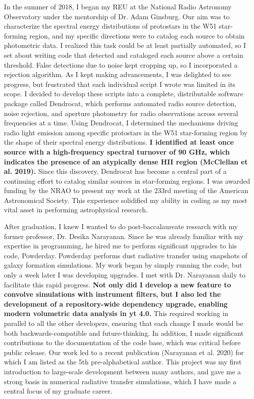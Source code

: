 \documentclass[11pt]{article}
\begin{document}
In the summer of 2018, I began my REU at the National Radio Astronomy Observatory under the mentorship of Dr. Adam Ginsburg. Our aim was to characterize the spectral energy distributions of protostars in the W51 star-forming region, and my specific directions were to catalog each source to obtain photometric data. I realized this task could be at least partially automated, so I set about writing code that detected and cataloged each source above a certain threshold. False detections due to noise kept cropping up, so I incorporated a rejection algorithm. As I kept making advancements, I was delighted to see progress, but frustrated that each individual script I wrote was limited in its scope. I decided to develop these scripts into a complete, distributable software package called Dendrocat, which performs automated radio source detection, noise rejection, and aperture photometry for radio observations across several frequencies at a time. Using Dendrocat, I determined the mechanisms driving radio light emission among specific protostars in the W51 star-forming region by the shape of their spectral energy distributions. \textbf{I identified at least once source with a high-frequency spectral turnover of 90 GHz, which indicates the presence of an atypically dense HII region (McClellan et al. 2019).} Since this discovery, Dendrocat has become a central part of a continuing effort to catalog similar sources in star-forming regions. I was awarded funding by the NRAO to present my work at the 233rd meeting of the American Astronomical Society. This experience solidified my ability in coding as my most vital asset in performing astrophysical research.

After graduation, I knew I wanted to do post-baccalaureate research with my former professor, Dr. Desika Narayanan. Since he was already familiar with my expertise in programming, he hired me to perform significant upgrades to his code, Powderday. Powderday performs dust radiative transfer using snapshots of galaxy formation simulations. My work began by simply running the code, but only a week later I was developing upgrades. I met with Dr. Narayanan daily to facilitate this rapid progress. \textbf{Not only did I develop a new feature to convolve simulations with instrument filters, but I also led the development of a repository-wide dependency upgrade, enabling modern volumetric data analysis in yt 4.0.} This required working in parallel to all the other developers, ensuring that each change I made would be both backwards-compatible and future-thinking. In addition, I made significant contributions to the documentation of the code base, which was critical before public release. Our work led to a recent publication (Narayanan et al. 2020) for which I am listed as the 5th pre-alphabetical author. This project was my first introduction to large-scale development between many authors, and gave me a strong basis in numerical radiative transfer simulations, which I have made a central focus of my graduate career.
\end{document}
